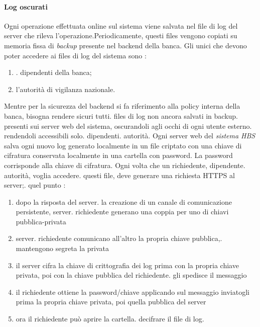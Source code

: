	\paragraph{Log oscurati}
Ogni operazione effettuata online sul sistema viene salvata nel file di log del server che rileva l'operazione.Periodicamente, questi files vengono copiati su memoria fissa di \emph{backup} presente nel backend della banca.
Gli unici che devono poter accedere ai files di log del sistema sono :
\begin{enumerate}
\item. dipendenti della banca;
\item l'autorità di vigilanza nazionale.
\end{enumerate}
Mentre per la sicurezza del backend si fa riferimento alla policy interna della banca, bisogna rendere sicuri tutti. files di log non ancora salvati in backup. presenti sui server web del sistema, oscurandoli agli occhi di ogni utente esterno. rendendoli accessibili solo. dipendenti. autorità.
Ogni server web del \emph{sistema HBS} salva ogni nuovo log generato localmente in un file criptato con una chiave di cifratura conservata localmente in una cartella con password.
La password corrisponde alla chiave di cifratura.
\linebreak
 Ogni volta che un richiedente, dipendente. autorità, voglia accedere. questi file, deve generare una richiesta HTTPS al server;. quel punto :
 \begin{enumerate}
 \item dopo la risposta del server. la creazione di un canale di comunicazione persistente, server. richiedente generano una coppia per uno di chiavi pubblica-privata
 \item server. richiedente comunicano all'altro la propria chiave pubblica,. mantengono segreta la privata
 \item il server cifra la chiave di crittografia dei log prima con la propria chiave privata, poi con la chiave pubblica del richiedente. gli spedisce il messaggio
 \item il richiedente ottiene la password/chiave applicando sul messaggio inviatogli prima la propria chiave privata, poi quella pubblica del server
 \item ora il richiedente può aprire la cartella. decifrare il file di log.
 \end{enumerate}












